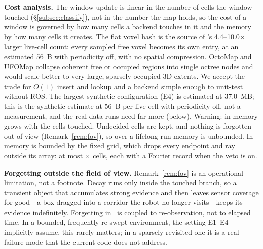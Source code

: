 \noindent\textbf{Cost analysis.} The window update is linear in the number of cells the window touched (\S\ref{subsec:classify}), not in the number the map holds, so the cost of a window is governed by how many cells a backend touches in it and the memory by how many cells it creates. The flat voxel hash is the source of 's 4.4--10.0$\times$ larger live-cell count: every sampled free voxel becomes its own entry, at an estimated 56~B with periodicity off, with no spatial compression. OctoMap \citep{hornung2013octomap} and UFOMap \citep{duberg2020ufomap} collapse coherent free or occupied regions into single octree nodes and would scale better to very large, sparsely occupied 3D extents. We accept the trade for $O(1)$ insert and lookup and a backend simple enough to unit-test without ROS. The largest synthetic configuration (E4) is estimated at 37.0~MB; this is the synthetic estimate at 56~B per live cell with periodicity off, not a measurement, and the real-data runs need far more (below). Warning: in  memory grows with the cells touched. Undecided cells are kept, and nothing is forgotten out of view (Remark~\ref{rem:fov}), so over a lifelong run memory is unbounded. In  memory is bounded by the fixed grid, which drops every endpoint and ray outside its array: at most $\times$ cells, each with a Fourier record when the veto is on.

\noindent\textbf{Forgetting outside the field of view.} Remark~\ref{rem:fov} is an operational limitation, not a footnote. Decay runs only inside the touched branch, so a transient object that accumulates strong evidence and then leaves sensor coverage for good---a box dragged into a corridor the robot no longer visits---keeps its evidence indefinitely. Forgetting in \sname\ is coupled to re-observation, not to elapsed time. In a bounded, frequently re-swept environment, the setting E1--E4 implicitly assume, this rarely matters; in a sparsely revisited one it is a real failure mode that the current code does not address.

